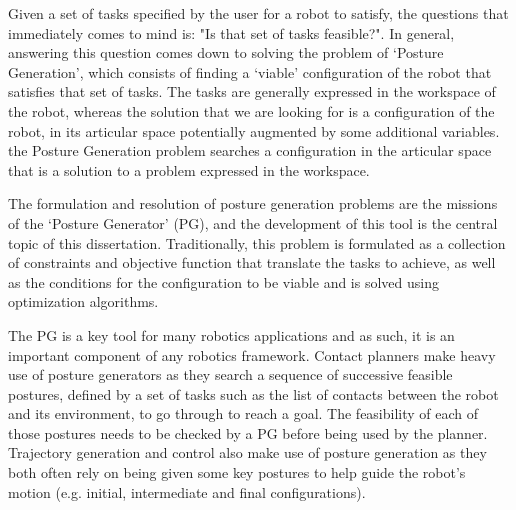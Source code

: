 Given a set of tasks specified by the user for a robot to satisfy, the questions that immediately comes to mind is: "Is that set of tasks feasible?".
In general, answering this question comes down to solving the problem of `Posture Generation', which consists of finding a `viable' configuration of the robot that satisfies that set of tasks.
The tasks are generally expressed in the workspace of the robot, whereas the solution that we are looking for is a configuration of the robot, in its articular space potentially augmented by some additional variables. %
the Posture Generation problem searches a configuration in the articular space that is a solution to a problem expressed in the workspace.

The formulation and resolution of posture generation problems are the missions of the `Posture Generator' (PG), and the development of this tool is the central topic of this dissertation.
Traditionally, this problem is formulated as a collection of constraints and objective function that translate the tasks to achieve, as well as the conditions for the configuration to be viable and is solved using optimization algorithms.

The PG is a key tool for many robotics applications and as such, it is an important component of any robotics framework.
Contact planners make heavy use of posture generators as they search a sequence of successive feasible postures, defined by a set of tasks such as the list of contacts between the robot and its environment, to go through to reach a goal.
The feasibility of each of those postures needs to be checked by a PG before being used by the planner.
Trajectory generation and control also make use of posture generation as they both often rely on being given some key postures to help guide the robot's motion (e.g. initial, intermediate and final configurations).



